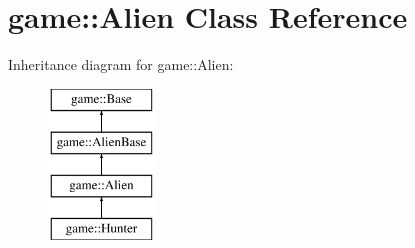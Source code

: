 \hypertarget{classgame_1_1Alien}{}\section{game\+:\+:Alien Class Reference}
\label{classgame_1_1Alien}
Inheritance diagram for game\+:\+:Alien\+:\begin{figure}[H]
\begin{center}
\leavevmode
\includegraphics[height=4.000000cm]{classgame_1_1Alien}
\end{center}
\end{figure}
